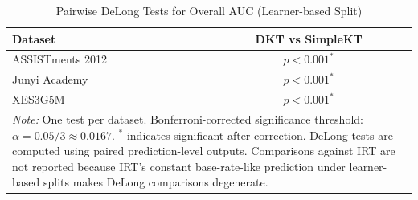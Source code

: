 \begin{table}[htbp]
\caption{Pairwise DeLong Tests for Overall AUC (Learner-based Split)}
\label{tab:delong_overall}
\centering
\scriptsize
\setlength{\tabcolsep}{3pt}
\begin{tabular}{lc}
\toprule
\textbf{Dataset} & \textbf{DKT vs SimpleKT} \\
\midrule
ASSISTments 2012 & $p < 0.001^{*}$ \\
Junyi Academy    & $p < 0.001^{*}$ \\
XES3G5M          & $p < 0.001^{*}$ \\
\bottomrule
\multicolumn{2}{p{6.5cm}}{\textit{Note:} One test per dataset. Bonferroni-corrected significance threshold: $\alpha = 0.05/3 \approx 0.0167$. $^{*}$ indicates significant after correction. DeLong tests are computed using paired prediction-level outputs. Comparisons against IRT are not reported because IRT's constant base-rate-like prediction under learner-based splits makes DeLong comparisons degenerate.} \\
\end{tabular}
\end{table}

